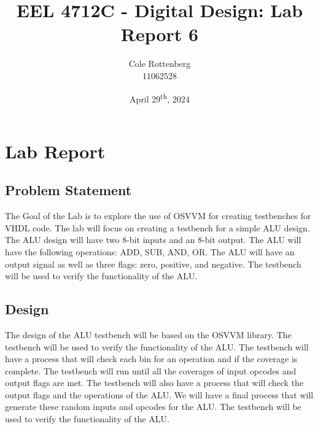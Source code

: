 \documentclass{article}
\title{EEL 4712C - Digital Design: Lab Report 6}
\author{Cole Rottenberg \\ 11062528}
\date{April 29\textsuperscript{th}, 2024}
\begin{document}
\maketitle

\section*{Lab Report}

\subsection*{Problem Statement}
The Goal of the Lab is to explore the use of OSVVM for creating testbenches for VHDL code. The lab will focus on creating a testbench for a simple ALU design. The ALU design will have two 8-bit inputs and an 8-bit output. The ALU will have the following operations: ADD, SUB, AND, OR. The ALU will have an output signal as well as three flags: zero, positive, and negative. The testbench will be used to verify the functionality of the ALU.
\subsection*{Design}
The design of the ALU testbench will be based on the OSVVM library. The testbench will be used to verify the functionality of the ALU. The testbench will have a process that will check each bin for an operation and if the coverage is complete. The testbench will run until all the coverages of input opcodes and output flags are met. The testbench will also have a process that will check the output flags and the operations of the ALU. We will have a final process that will generate these random inputs and opcodes for the ALU. The testbench will be used to verify the functionality of the ALU.
\end{document}

